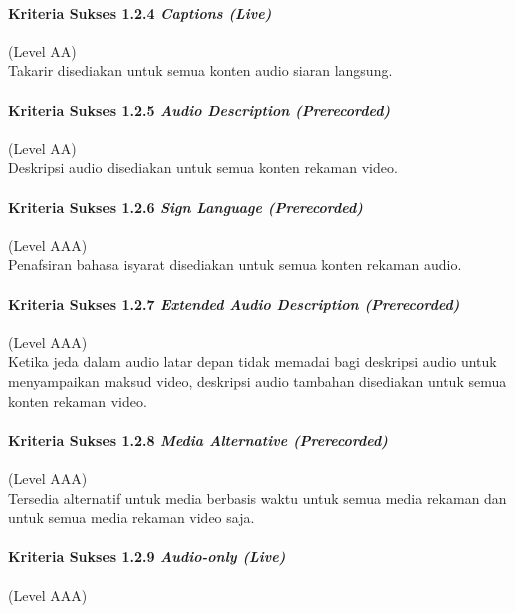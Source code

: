 \documentclass[a4paper,twoside]{article}
\begin{document}
\begin{enumerate}
		\paragraph{Kriteria Sukses 1.2.4 \textit{Captions (Live)}}
		\label{sec:kriteria_sukses_1.2.4}
		(Level AA)\\

		Takarir disediakan untuk semua konten audio siaran langsung.

		\paragraph{Kriteria Sukses 1.2.5 \textit{Audio Description (Prerecorded)}}
		\label{sec:kriteria_sukses_1.2.5}
		(Level AA)\\

		Deskripsi audio disediakan untuk semua konten rekaman video.

		\paragraph{Kriteria Sukses 1.2.6 \textit{Sign Language (Prerecorded)}}
		\label{sec:kriteria_sukses_1.2.6}
		(Level AAA)\\

		Penafsiran bahasa isyarat disediakan untuk semua konten rekaman audio. 

		\paragraph{Kriteria Sukses 1.2.7 \textit{Extended Audio Description (Prerecorded)}}
		\label{sec:kriteria_sukses_1.2.7}
		(Level AAA)\\

		Ketika jeda dalam audio latar depan tidak memadai bagi deskripsi audio untuk menyampaikan maksud video, deskripsi audio tambahan disediakan untuk semua konten rekaman video.

		\paragraph{Kriteria Sukses 1.2.8 \textit{Media Alternative (Prerecorded)}}
		\label{sec:kriteria_sukses_1.2.8}
		(Level AAA)\\

		Tersedia alternatif untuk media berbasis waktu untuk semua media rekaman dan untuk semua media rekaman video saja.

		\paragraph{Kriteria Sukses 1.2.9 \textit{Audio-only (Live)}}
		\label{sec:kriteria_sukses_1.2.9}
		(Level AAA)\\


\end{enumerate}
\end{document}
